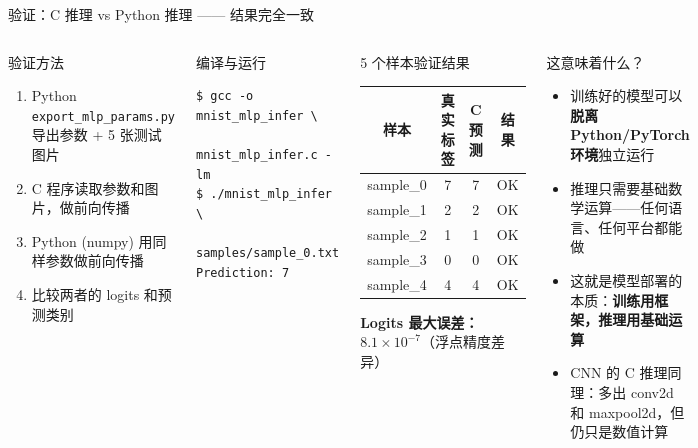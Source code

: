 \documentclass[aspectratio=169]{ctexbeamer}
\begin{document}
\begin{frame}[fragile,shrink=15]{验证：C 推理 vs Python 推理 —— 结果完全一致}
\small

\begin{columns}[T]
\begin{block}{验证方法}
\footnotesize
\begin{enumerate}
  \item Python \texttt{export\_mlp\_params.py} 导出参数 + 5 张测试图片
  \item C 程序读取参数和图片，做前向传播
  \item Python (numpy) 用同样参数做前向传播
  \item 比较两者的 logits 和预测类别
\end{enumerate}
\end{block}

\begin{block}{编译与运行}
\footnotesize
\begin{lstlisting}[basicstyle=\ttfamily\footnotesize, frame=none, numbers=none, backgroundcolor=\color{codebg}]
$ gcc -o mnist_mlp_infer \
    mnist_mlp_infer.c -lm
$ ./mnist_mlp_infer \
    samples/sample_0.txt
Prediction: 7
\end{lstlisting}
\end{block}

\begin{block}{5 个样本验证结果}
\footnotesize
\begin{center}
\begin{tabular}{c c c c}
\toprule
\textbf{样本} & \textbf{真实标签} & \textbf{C 预测} & \textbf{结果} \\
\midrule
sample\_0 & 7 & 7 & OK \\
sample\_1 & 2 & 2 & OK \\
sample\_2 & 1 & 1 & OK \\
sample\_3 & 0 & 0 & OK \\
sample\_4 & 4 & 4 & OK \\
\bottomrule
\end{tabular}
\end{center}
\textbf{Logits 最大误差：}$8.1 \times 10^{-7}$（浮点精度差异）
\end{block}

\vspace{0.15cm}

\begin{exampleblock}{这意味着什么？}
\footnotesize
\begin{itemize}
  \item 训练好的模型可以\textbf{脱离 Python/PyTorch 环境}独立运行
  \item 推理只需要基础数学运算——任何语言、任何平台都能做
  \item 这就是模型部署的本质：\textbf{训练用框架，推理用基础运算}
  \item CNN 的 C 推理同理：多出 conv2d 和 maxpool2d，但仍只是数值计算
\end{itemize}
\end{exampleblock}
\end{columns}
\end{frame}
\end{document}
